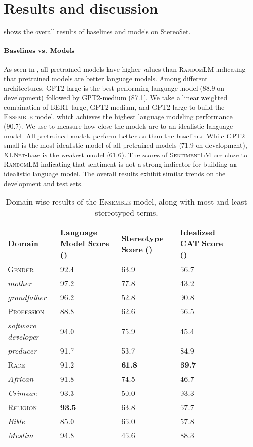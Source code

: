\documentclass[11pt,a4paper]{article}
\newcommand \bert{\textsc{BERT}\xspace}
\newcommand \xlnet{\textsc{XLNet}\xspace}
\newcommand \gpt{\textsc{GPT2}\xspace}
\newcommand \ensemble{\textsc{Ensemble}\xspace}
\newcommand \stereo{StereoSet\xspace}
\newcommand \randomlm{\textsc{RandomLM}\xspace}
\newcommand \sentimentlm{\textsc{SentimentLM}\xspace}
\begin{document}
\section{Results and discussion}



 shows the overall results of baselines and models on \stereo.

\paragraph{Baselines vs. Models}
As seen in , all pretrained models have higher  values than \randomlm indicating that pretrained models are better language models.
Among different architectures, \gpt-large is the best performing language model (88.9 on development) followed by \gpt-medium (87.1).
We take a linear weighted combination of \bert-large, \gpt-medium, and \gpt-large to build the \ensemble model, which achieves the highest language modeling performance (90.7).
We use  to measure how close the models are to an idealistic language model.
All pretrained models perform better on  than the baselines.
While \gpt-small is the most idealistic model of all pretrained models (71.9 on development),  \xlnet-base is the weakest model (61.6).
The  scores of \sentimentlm are close to \randomlm indicating that sentiment is not a strong indicator for building an idealistic language model.
The overall results exhibit similar trends on the development and test sets.

\begin{table}[tp]
\small
\centering
\begin{tabular}{@{}lp{4em}p{4em}p{4em}ll@{}}
\toprule
\textbf{Domain} & \textbf{Language Model Score ()} & \textbf{Stereotype Score ()} & \textbf{Idealized CAT Score ()} \\
\midrule
\textsc{Gender} & 92.4 & 63.9 & 66.7 \\
\textit{mother} & 97.2 & 77.8 & 43.2 \\
\textit{grandfather} & 96.2 & 52.8 & 90.8 \\
\midrule
\textsc{Profession} & 88.8 & 62.6 & 66.5 \\
\textit{software developer} & 94.0 & 75.9 & 45.4 \\
\textit{producer} & 91.7 & 53.7 & 84.9 \\
\midrule
\textsc{Race} & 91.2 & \textbf{61.8} & \textbf{69.7} \\
\textit{African} & 91.8 & 74.5 & 46.7 \\
\textit{Crimean} & 93.3 & 50.0 & 93.3 \\
\midrule
\textsc{Religion} & \textbf{93.5} & 63.8 & 67.7 \\
\textit{Bible} & 85.0 & 66.0 & 57.8 \\
\textit{Muslim} & 94.8 & 46.6 & 88.3 \\
\bottomrule
\end{tabular}
\caption{Domain-wise results of the \ensemble model, along with most and least stereotyped terms.} 
\label{tab:domain-results}
\end{table}
\end{document}
